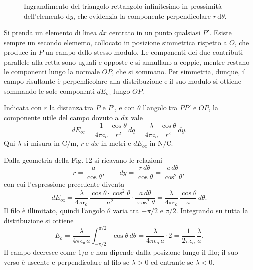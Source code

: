 \documentclass[11pt,a4paper]{article}
\begin{document}
\begin{figure}[htbp]
	\caption{Ingrandimento del triangolo rettangolo infinitesimo in prossimità dell'elemento $\mathrm{d}y$, che evidenzia la componente perpendicolare $r\,\mathrm{d}\theta$.}
	\label{fig:ingrandimento_dy_infografica}
\end{figure}

Si prenda un elemento di linea $dx$ centrato in un punto qualsiasi $P'$. Esiste sempre un secondo elemento, collocato in posizione simmetrica rispetto a $O$, che produce in $P$ un campo dello stesso modulo. Le componenti dei due contributi parallele alla retta sono uguali e opposte e si annullano a coppie, mentre restano le componenti lungo la normale $OP$, che si sommano. Per simmetria, dunque, il campo risultante è perpendicolare alla distribuzione e il suo modulo si ottiene sommando le sole componenti $dE_{oz}$ lungo $OP$.

Indicata con $r$ la distanza tra $P$ e $P'$, e con $\theta$ l'angolo tra $PP'$ e $OP$, la componente utile del campo dovuto a $dx$ vale
\begin{equation}
	dE_{oz}=\frac{1}{4\pi\epsilon_{o}}\,\frac{\cos\theta}{r^{2}}\,dq=\frac{\lambda}{4\pi\epsilon_{o}}\,\frac{\cos\theta}{r^{2}}\,dy .
\end{equation}
Qui $\lambda$ si misura in $\text{C/m}$, $r$ e $dx$ in metri e $dE_{oz}$ in $\text{N/C}$.

Dalla geometria della Fig. 12 si ricavano le relazioni
\begin{equation}
	r=\frac{a}{\cos\theta},\qquad dy=\frac{r\,d\theta}{\cos\theta}=\frac{a\,d\theta}{\cos^{2}\theta},
\end{equation}
con cui l'espressione precedente diventa
\begin{equation}
	dE_{oz}=\frac{\lambda}{4\pi\epsilon_{o}}\,\frac{\cos\theta\cdot\cos^{2}\theta}{a^{2}}\cdot\frac{a\,d\theta}{\cos^{2}\theta}=\frac{\lambda}{4\pi\epsilon_{o}}\,\frac{\cos\theta}{a}\,d\theta .
\end{equation}
Il filo è illimitato, quindi l'angolo $\theta$ varia tra $-\pi/2$ e $\pi/2$. Integrando su tutta la distribuzione si ottiene
\begin{equation}
	E_{o}=\frac{\lambda}{4\pi\epsilon_{o}\,a}\int_{-\pi/2}^{\pi/2}\cos\theta\,d\theta=\frac{\lambda}{4\pi\epsilon_{o}\,a}\cdot 2=\frac{1}{2\pi\epsilon_{o}}\,\frac{\lambda}{a}.
\end{equation}
Il campo decresce come $1/a$ e non dipende dalla posizione lungo il filo; il suo verso è uscente e perpendicolare al filo se $\lambda>0$ ed entrante se $\lambda<0$.
\end{document}
